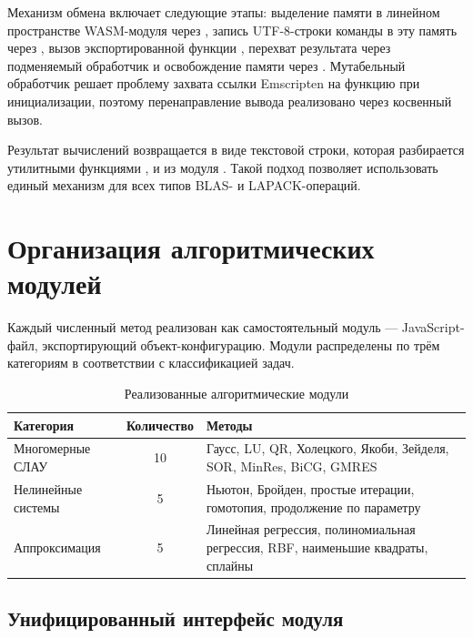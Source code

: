\documentclass[12pt, oneside]{book}
\begin{document}
    \quad Механизм обмена включает следующие этапы: выделение памяти в линейном пространстве WASM-модуля через \texttt{}, запись UTF-8-строки команды в эту память через \texttt{}, вызов экспортированной функции \texttt{}, перехват результата через подменяемый обработчик \texttt{} и освобождение памяти через \texttt{}. Мутабельный обработчик \texttt{} решает проблему захвата ссылки Emscripten на функцию \texttt{} при инициализации, поэтому перенаправление вывода реализовано через косвенный вызов.

    \quad Результат вычислений возвращается в виде текстовой строки, которая разбирается утилитными функциями \texttt{}, \texttt{} и \texttt{} из модуля \texttt{}. Такой подход позволяет использовать единый механизм для всех типов BLAS- и LAPACK-операций.

\section{Организация алгоритмических модулей}

    \quad Каждый численный метод реализован как самостоятельный модуль --- JavaScript-файл, экспортирующий объект-конфигурацию. Модули распределены по трём категориям в соответствии с классификацией задач.

\begin{table}[h]
    \centering
    \caption{Реализованные алгоритмические модули}
    \begin{tabular}{|p{4cm}|c|p{7cm}|}
        \hline
        Категория & Количество & Методы \\
        \hline
        Многомерные СЛАУ & 10 & Гаусс, LU, QR, Холецкого, Якоби, Зейделя, SOR, MinRes, BiCG, GMRES \\
        \hline
        Нелинейные системы & 5 & Ньютон, Бройден, простые итерации, гомотопия, продолжение по параметру \\
        \hline
        Аппроксимация & 5 & Линейная регрессия, полиномиальная регрессия, RBF, наименьшие квадраты, сплайны \\
        \hline
    \end{tabular}
\end{table}

\subsection{Унифицированный интерфейс модуля}
\end{document}
